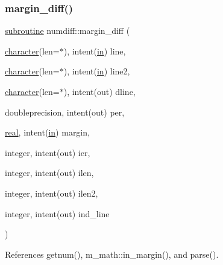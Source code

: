 \subsubsection{\texorpdfstring{margin\+\_\+diff()}{margin\_diff()}}
{\footnotesize\ttfamily \hyperlink{M__stopwatch_83_8txt_acfbcff50169d691ff02d4a123ed70482}{subroutine} numdiff\+::margin\+\_\+diff (\begin{DoxyParamCaption}\item[{\hyperlink{option__stopwatch_83_8txt_abd4b21fbbd175834027b5224bfe97e66}{character}(len=$\ast$), intent(\hyperlink{M__journal_83_8txt_afce72651d1eed785a2132bee863b2f38}{in})}]{line,  }\item[{\hyperlink{option__stopwatch_83_8txt_abd4b21fbbd175834027b5224bfe97e66}{character}(len=$\ast$), intent(\hyperlink{M__journal_83_8txt_afce72651d1eed785a2132bee863b2f38}{in})}]{line2,  }\item[{\hyperlink{option__stopwatch_83_8txt_abd4b21fbbd175834027b5224bfe97e66}{character}(len=$\ast$), intent(out)}]{dline,  }\item[{doubleprecision, intent(out)}]{per,  }\item[{\hyperlink{read__watch_83_8txt_abdb62bde002f38ef75f810d3a905a823}{real}, intent(\hyperlink{M__journal_83_8txt_afce72651d1eed785a2132bee863b2f38}{in})}]{margin,  }\item[{integer, intent(out)}]{ier,  }\item[{integer, intent(out)}]{ilen,  }\item[{integer, intent(out)}]{ilen2,  }\item[{integer, intent(out)}]{ind\+\_\+line }\end{DoxyParamCaption})}



References getnum(), m\+\_\+math\+::in\+\_\+margin(), and parse().

\mbox{\label{numdiff_8f90_a5bf0d2166ed3d2cb137b6084621a231f}} 
